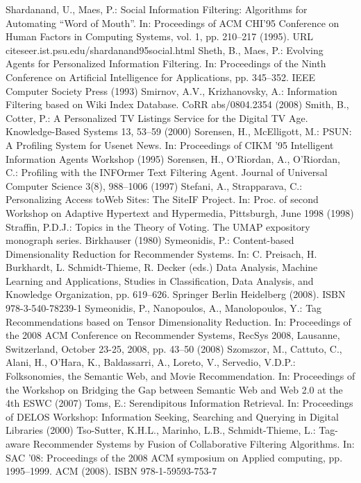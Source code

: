 \begin{thebibliography}{110}
Shardanand, U., Maes, P.: Social Information Filtering: Algorithms for Automating “Word of Mouth”. In: Proceedings of ACM CHI’95 Conference on Human Factors in Computing Systems, vol. 1, pp. 210–217 (1995). URL citeseer.ist.psu.edu/shardanand95social.html
Sheth, B., Maes, P.: Evolving Agents for Personalized Information Filtering. In: Proceedings of the Ninth Conference on Artificial Intelligence for Applications, pp. 345–352. IEEE Computer Society Press (1993)
Smirnov, A.V., Krizhanovsky, A.: Information Filtering based on Wiki Index Database. CoRR abs/0804.2354 (2008)
Smith, B., Cotter, P.: A Personalized TV Listings Service for the Digital TV Age. Knowledge-Based Systems 13, 53–59 (2000)
Sorensen, H., McElligott, M.: PSUN: A Profiling System for Usenet News. In: Proceedings of CIKM ’95 Intelligent Information Agents Workshop (1995)
Sorensen, H., O’Riordan, A., O’Riordan, C.: Profiling with the INFOrmer Text Filtering Agent. Journal of Universal Computer Science 3(8), 988–1006 (1997)
Stefani, A., Strapparava, C.: Personalizing Access toWeb Sites: The SiteIF Project. In: Proc. of second Workshop on Adaptive Hypertext and Hypermedia, Pittsburgh, June 1998 (1998)
Straffin, P.D.J.: Topics in the Theory of Voting. The UMAP expository monograph series. Birkhauser (1980)
Symeonidis, P.: Content-based Dimensionality Reduction for Recommender Systems. In: C. Preisach, H. Burkhardt, L. Schmidt-Thieme, R. Decker (eds.) Data Analysis, Machine Learning and Applications, Studies in Classification, Data Analysis, and Knowledge Organization, pp. 619–626. Springer Berlin Heidelberg (2008). ISBN 978-3-540-78239-1
Symeonidis, P., Nanopoulos, A., Manolopoulos, Y.: Tag Recommendations based on Tensor Dimensionality Reduction. In: Proceedings of the 2008 ACM Conference on Recommender Systems, RecSys 2008, Lausanne, Switzerland, October 23-25, 2008, pp. 43–50 (2008)
Szomszor, M., Cattuto, C., Alani, H., O’Hara, K., Baldassarri, A., Loreto, V., Servedio, V.D.P.: Folksonomies, the Semantic Web, and Movie Recommendation. In: Proceedings of the Workshop on Bridging the Gap between Semantic Web and Web 2.0 at the 4th ESWC (2007)
Toms, E.: Serendipitous Information Retrieval. In: Proceedings of DELOS Workshop: Information Seeking, Searching and Querying in Digital Libraries (2000)
Tso-Sutter, K.H.L., Marinho, L.B., Schmidt-Thieme, L.: Tag-aware Recommender Systems by Fusion of Collaborative Filtering Algorithms. In: SAC ’08: Proceedings of the 2008 ACM symposium on Applied computing, pp. 1995–1999. ACM (2008). ISBN 978-1-59593-753-7

\end{thebibliography}

